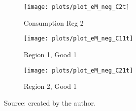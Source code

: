 \documentclass[../thesis.tex]{subfiles}
\begin{document}
\begin{figure}[h!]
	\vspace*{0.1cm}
	\begin{subfigure}[b]{0.27\textwidth}
		\centering
		\texttt{[image: plots/plot\_eM\_neg\_C2t]}
		\caption{\scriptsize Consumption Reg 2}
		\label{fig:eM-neg-C2t}
	\end{subfigure}
	\hspace*{0.5cm}
	\begin{subfigure}[b]{0.27\textwidth}
		\centering
		\texttt{[image: plots/plot\_eM\_neg\_C11t]}
		\caption{\scriptsize Region 1, Good 1}
		\label{fig:eM-neg-C11t}
	\end{subfigure}
	\hspace*{0.5cm}
	\begin{subfigure}[b]{0.27\textwidth}
		\centering
		\texttt{[image: plots/plot\_eM\_neg\_C21t]}
		\caption{\scriptsize Region 2, Good 1}
		\label{fig:eM-neg-C21t}
	\end{subfigure}
	\caption*{Source: created by the author.}
	\label{fig:eM-neg-irf}
\end{figure}


\newpage
\end{document}
